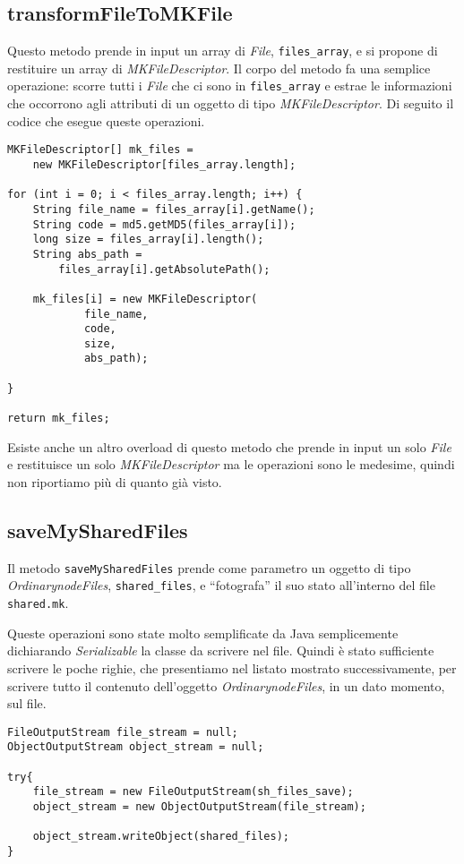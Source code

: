 \subsection{transformFileToMKFile}
Questo metodo prende in input un array di \emph{File}, \verb|files_array|, e si propone di restituire un array di \emph{MKFileDescriptor}.
Il corpo del metodo fa una semplice operazione: scorre tutti i \emph{File} che ci sono in \verb|files_array| e estrae le informazioni che occorrono agli attributi di un oggetto di tipo \emph{MKFileDescriptor}.
Di seguito il codice che esegue queste operazioni.
\begin{lstlisting}
MKFileDescriptor[] mk_files = 
	new MKFileDescriptor[files_array.length];

for (int i = 0; i < files_array.length; i++) {
	String file_name = files_array[i].getName();
	String code = md5.getMD5(files_array[i]);
	long size = files_array[i].length();
	String abs_path = 
		files_array[i].getAbsolutePath();
		
	mk_files[i] = new MKFileDescriptor(
			file_name,
			code,
			size,
			abs_path);

}

return mk_files;
\end{lstlisting}
Esiste anche un altro overload di questo metodo che prende in input un solo \emph{File} e restituisce un solo \emph{MKFileDescriptor} ma le operazioni sono le medesime, quindi non riportiamo più di quanto già visto.

\subsection{saveMySharedFiles}
Il metodo \verb|saveMySharedFiles| prende come parametro un oggetto di tipo \emph{OrdinarynodeFiles}, \verb|shared_files|, e ``fotografa'' il suo stato all'interno del file \verb|shared.mk|.

Queste operazioni sono state molto semplificate da Java semplicemente dichiarando \emph{Serializable} la classe da scrivere nel file.
Quindi è stato sufficiente scrivere le poche righie, che presentiamo nel listato mostrato successivamente, per scrivere tutto il contenuto dell'oggetto \emph{OrdinarynodeFiles}, in un dato momento, sul file.
\begin{lstlisting}
FileOutputStream file_stream = null;
ObjectOutputStream object_stream = null;

try{
	file_stream = new FileOutputStream(sh_files_save);
	object_stream = new ObjectOutputStream(file_stream);

	object_stream.writeObject(shared_files);
}
\end{lstlisting}


